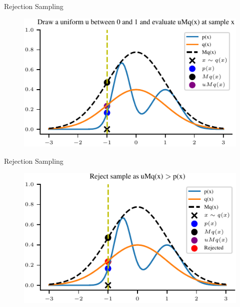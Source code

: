 \documentclass[handout]{beamer}
\begin{document}
    \begin{frame}{Rejection Sampling}
        \begin{figure}
            \centering
            \includegraphics{../figures/sampling/rejection-sampling--1.0-True-True-True-True-True-True-True-False.pdf}
        \end{figure}
    \end{frame}

    \begin{frame}{Rejection Sampling}
        \begin{figure}
            \centering
            \includegraphics{../figures/sampling/rejection-sampling--1.0-True-True-True-True-True-True-True-True.pdf}
        \end{figure}
    \end{frame}

        
    
\end{document}
